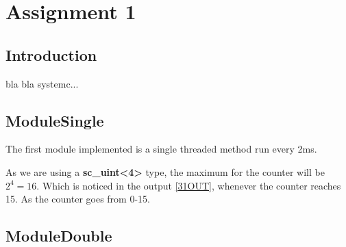 \documentclass[a4paper,12pt]{report}    %
\begin{document}
\lstset{style=output}

\tableofcontents
\pagestyle{ProjectReport}
\newpage
\lstlistoflistings
\newpage

\chapter{Assignment 1}
\section{Introduction}

bla bla systemc...

\newpage
\section{ModuleSingle}

The first module implemented is a single threaded method run every 2ms. 

\lstset{style=code}




As we are using a \textbf{sc\_uint<4>} type, the maximum for the counter will be \( 2^4 = 16 \). Which is noticed in the output \ref{31OUT}, whenever the counter reaches 15. As the counter goes from 0-15.

\lstset{style=output}


\newpage
\section{ModuleDouble}
\end{document}

